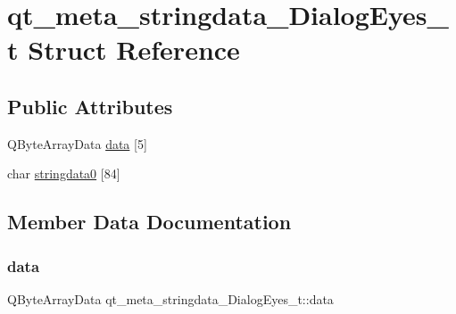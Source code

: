 \hypertarget{structqt__meta__stringdata___dialog_eyes__t}{}\section{qt\+\_\+meta\+\_\+stringdata\+\_\+\+Dialog\+Eyes\+\_\+t Struct Reference}
\label{structqt__meta__stringdata___dialog_eyes__t}
\subsection*{Public Attributes}
\begin{DoxyCompactItemize}
\item 
Q\+Byte\+Array\+Data \hyperlink{structqt__meta__stringdata___dialog_eyes__t_ad659505232893d9249a61e4ea0d9628a}{data} \mbox{[}5\mbox{]}
\item 
char \hyperlink{structqt__meta__stringdata___dialog_eyes__t_a1ad6dad721de3132170d24f2879ce8c8}{stringdata0} \mbox{[}84\mbox{]}
\end{DoxyCompactItemize}


\subsection{Member Data Documentation}
\hypertarget{structqt__meta__stringdata___dialog_eyes__t_ad659505232893d9249a61e4ea0d9628a}{}\label{structqt__meta__stringdata___dialog_eyes__t_ad659505232893d9249a61e4ea0d9628a} 
\subsubsection{\texorpdfstring{data}{data}}
{\footnotesize\ttfamily Q\+Byte\+Array\+Data qt\+\_\+meta\+\_\+stringdata\+\_\+\+Dialog\+Eyes\+\_\+t\+::data}

\hypertarget{structqt__meta__stringdata___dialog_eyes__t_a1ad6dad721de3132170d24f2879ce8c8}{}\label{structqt__meta__stringdata___dialog_eyes__t_a1ad6dad721de3132170d24f2879ce8c8} 
